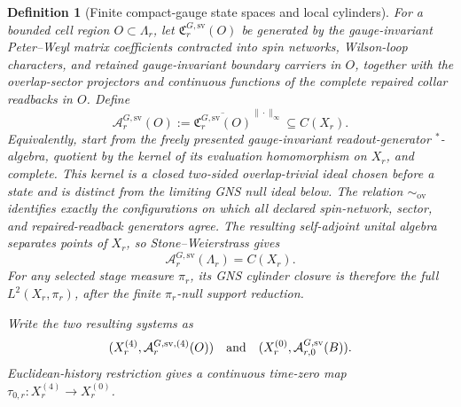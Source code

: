 \documentclass[11pt]{article}
\numberwithin{equation}{section}
\newtheorem{definition}[theorem]{Definition}
\theoremstyle{remark}
\begin{document}
\begin{definition}[Finite compact-gauge state spaces and local cylinders]
For a bounded cell region \(O\subset\Lambda_r\), let
\(\mathfrak C_r^{G,\mathrm{sv}}(O)\) be generated by the gauge-invariant Peter--Weyl matrix
coefficients contracted into spin networks, Wilson-loop characters, and retained gauge-invariant
boundary carriers in \(O\), together with the overlap-sector projectors and continuous functions
of the complete repaired collar readbacks in \(O\). Define
\[
\mathcal A_r^{G,\mathrm{sv}}(O)
:=\overline{\mathfrak C_r^{G,\mathrm{sv}}(O)}^{\|\cdot\|_\infty}
\subseteq C(X_r).
\]
Equivalently, start from the freely presented gauge-invariant readout-generator \(^*\)-algebra,
quotient by the kernel of its evaluation homomorphism on \(X_r\), and complete. This kernel is a
closed two-sided overlap-trivial ideal chosen before a state and is distinct from the limiting GNS
null ideal below.
The relation \(\sim_{\mathrm{ov}}\) identifies exactly the configurations on which all declared
spin-network, sector, and repaired-readback generators agree. The resulting self-adjoint unital
algebra separates points of \(X_r\), so Stone--Weierstrass gives
\[
\mathcal A_r^{G,\mathrm{sv}}(\Lambda_r)=C(X_r).
\]
For any selected stage measure \(\pi_r\), its GNS cylinder closure is therefore the full
\(L^2(X_r,\pi_r)\), after the finite \(\pi_r\)-null support reduction.

Write the two resulting systems as
\[
(X_r^{(4)},\mathcal A_r^{G,\mathrm{sv},(4)}(O))
\quad\hbox{and}\quad
(X_r^{(0)},\mathcal A_{r,0}^{G,\mathrm{sv}}(B)).
\]
Euclidean-history restriction gives a continuous time-zero map
\(\tau_{0,r}:X_r^{(4)}\to X_r^{(0)}\).


\end{definition}
\end{document}
